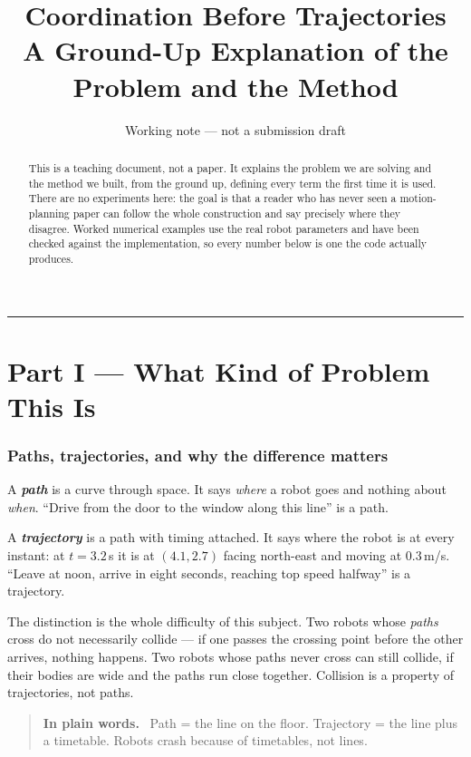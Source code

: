 \documentclass[11pt,a4paper]{article}
\title{\bfseries Coordination Before Trajectories\\[0.3em]
\large A Ground-Up Explanation of the Problem and the Method}
\author{Working note --- not a submission draft}
\date{}
\newcommand{\defn}[1]{\textbf{\textit{#1}}}
\newenvironment{keypoint}
  {\begin{quote}\small\noindent\textbf{In plain words.}\ }
  {\end{quote}}
\begin{document}
\maketitle

\begin{abstract}
\noindent
This is a teaching document, not a paper. It explains the problem we are solving and the
method we built, from the ground up, defining every term the first time it is used. There
are no experiments here: the goal is that a reader who has never seen a motion-planning
paper can follow the whole construction and say precisely where they disagree. Worked
numerical examples use the real robot parameters and have been checked against the
implementation, so every number below is one the code actually produces.
\end{abstract}

\tableofcontents

\bigskip\hrule\bigskip

\part*{Part I --- What Kind of Problem This Is}

\section{Paths, trajectories, and why the difference matters}

A \defn{path} is a curve through space. It says \emph{where} a robot goes and nothing about
\emph{when}. ``Drive from the door to the window along this line'' is a path.

A \defn{trajectory} is a path with timing attached. It says where the robot is at every
instant: at $t = 3.2$\,s it is at $(4.1, 2.7)$ facing north-east and moving at
$0.3$\,m/s. ``Leave at noon, arrive in eight seconds, reaching top speed halfway'' is a
trajectory.

The distinction is the whole difficulty of this subject. Two robots whose \emph{paths} cross
do not necessarily collide --- if one passes the crossing point before the other arrives,
nothing happens. Two robots whose paths never cross can still collide, if their bodies are
wide and the paths run close together. Collision is a property of trajectories, not paths.

\begin{keypoint}
Path = the line on the floor. Trajectory = the line plus a timetable. Robots crash because
of timetables, not lines.
\end{keypoint}
\end{document}
